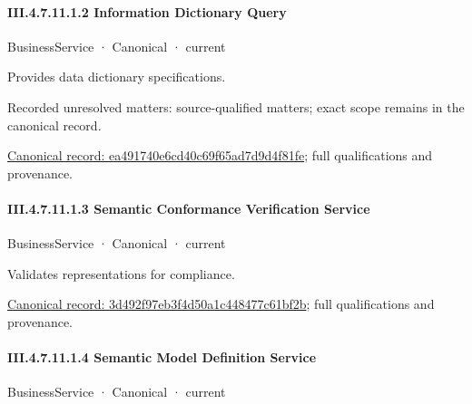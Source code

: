 \paragraph*{III.4.7.11.1.2 Information Dictionary Query}
\label{navigation:III.4.7.11.1.2}

\label{element:ea491740e6cd40c69f65ad7d9d4f81fe}
{\small BusinessService · Canonical · current}\par

Provides data dictionary specifications.


{\small Recorded unresolved matters: source-qualified matters; exact scope remains in the canonical record.}\par
{\footnotesize \href{../../../../continuum/business/business-service/ea491740e6cd40c69f65ad7d9d4f81fe.md}{Canonical record: ea491740e6cd40c69f65ad7d9d4f81fe}; full qualifications and provenance.}\par
\paragraph*{III.4.7.11.1.3 Semantic Conformance Verification Service}
\label{navigation:III.4.7.11.1.3}

\label{element:3d492f97eb3f4d50a1c448477c61bf2b}
{\small BusinessService · Canonical · current}\par

Validates representations for compliance.


{\footnotesize \href{../../../../continuum/business/business-service/3d492f97eb3f4d50a1c448477c61bf2b.md}{Canonical record: 3d492f97eb3f4d50a1c448477c61bf2b}; full qualifications and provenance.}\par
\paragraph*{III.4.7.11.1.4 Semantic Model Definition Service}
\label{navigation:III.4.7.11.1.4}

\label{element:0f6b41152f294a87b84970c74ab5a014}
{\small BusinessService · Canonical · current}\par

